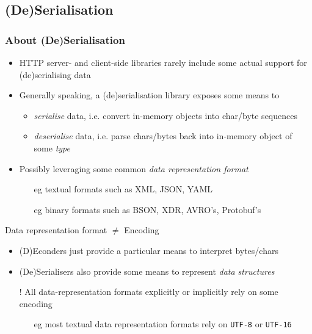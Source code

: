 \documentclass[presentation]{beamer}\mode<presentation>{\usetheme{AMSCesenaPurpleAndGold}}
\begin{document}
\subsection{(De)Serialisation}

\begin{frame}%
\frametitle{About (De)Serialisation}

    \begin{itemize}
        \item HTTP server- and client-side libraries rarely include some actual support for (de)serialising data

        \vfill

        \item Generally speaking, a (de)serialisation library exposes some means to
        \begin{itemize}
            \item \emph{serialise} data, i.e. convert  in-memory objects into char/byte sequences

            \item \emph{deserialise} data, i.e. parse chars/bytes back into in-memory object of some \emph{type}
        \end{itemize}

        \vfill

        \item Possibly leveraging some common \emph{data representation format}
        \begin{itemize}
            \item[eg] textual formats such as XML, JSON, YAML
            \item[eg] binary formats such as BSON, XDR, AVRO's, Protobuf's
        \end{itemize}
    \end{itemize}

    \vfill

    \begin{block}{Data representation format $\neq$ Encoding}\small
        \begin{itemize}
            \item (D)Econders just provide a particular means to interpret bytes/chars
            \item (De)Serialisers also provide some means to represent \emph{data structures}

            \item[!] All data-representation formats explicitly or implicitly rely on some encoding
            \begin{itemize}
                \item[eg] most textual data representation formats rely on \texttt{UTF-8} or \texttt{UTF-16}
            \end{itemize}
        \end{itemize}
    \end{block}

\end{frame}
\end{document}
